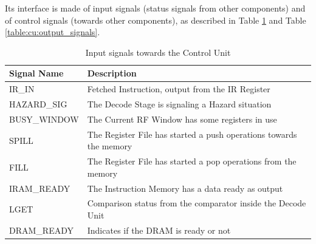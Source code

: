Its interface is made of input signals (status signals from other components) and of control signals (towards other components), as described in Table \ref{table:cu:input_signals} and Table \ref{table:cu:output_signals}.

\begin{table}[H]
    \centering
    \begin{tabular}{l|l}
        \textbf{Signal Name} & \textbf{Description}\\
        \hline
        IR\_IN & Fetched Instruction, output from the IR Register \\
        HAZARD\_SIG & The Decode Stage is signaling a Hazard situation \\
        BUSY\_WINDOW & The Current RF Window has some registers in use \\
        SPILL & The Register File has started a push operations towards the memory \\
        FILL & The Register File has started a pop operations from the memory \\
        IRAM\_READY & The Instruction Memory has a data ready as output \\
        LGET & Comparison status from the comparator inside the Decode Unit\\
        DRAM\_READY & Indicates if the DRAM is ready or not\\
    \end{tabular}
    \caption{Input signals towards the Control Unit}
    \label{table:cu:input_signals}
\end{table}

